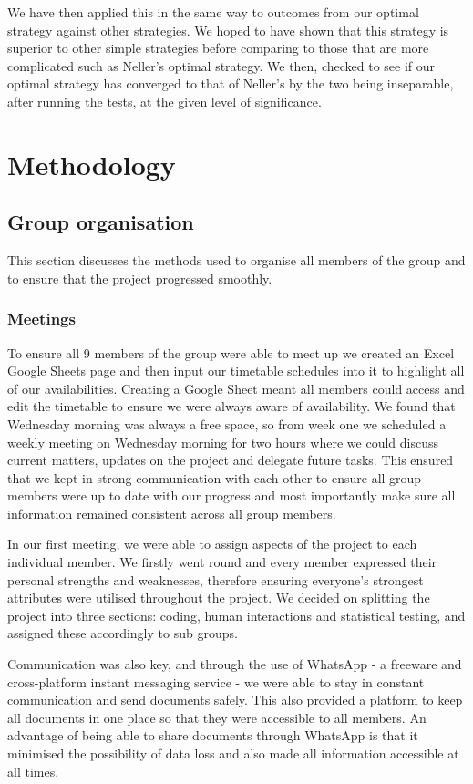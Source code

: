 \documentclass[a4paper,titlepage]{article}
\begin{document}
We have then applied this in the same way to outcomes from our optimal strategy against other strategies. We hoped to have shown that this strategy is superior to other simple strategies before comparing to those that are more complicated such as Neller’s optimal strategy. We then, checked to see if our optimal strategy has converged to that of Neller’s by the two being inseparable, after running the tests, at the given level of significance.

\section{Methodology}
\subsection{Group organisation}
This section discusses the methods used to organise all members of the group and to ensure that the project progressed smoothly.

\subsubsection{Meetings}
To ensure all 9 members of the group were able to meet up we created an Excel Google Sheets page and then input our timetable schedules into it to highlight all of our availabilities. Creating a Google Sheet meant all members could access and edit the timetable to ensure we were always aware of availability. We found that Wednesday morning was always a free space, so from week one we scheduled a weekly meeting on Wednesday morning for two hours where we could discuss current matters, updates on the project and delegate future tasks. This ensured that we kept in strong communication with each other to ensure all group members were up to date with our progress and most importantly make sure all information remained consistent across all group members.

In our first meeting, we were able to assign aspects of the project to each individual member. We firstly went round and every member expressed their personal strengths and weaknesses, therefore ensuring everyone's strongest attributes were utilised throughout the project. We decided on splitting the project into three sections: coding, human interactions and statistical testing, and assigned these accordingly to sub groups.

Communication was also key, and through the use of WhatsApp - a freeware and cross-platform instant messaging service - we were able to stay in constant communication and send documents safely. This also provided a platform to keep all documents in one place so that they were accessible to all members. An advantage of being able to share documents through WhatsApp is that it minimised the possibility of data loss and also made all information accessible at all times.
\end{document}
